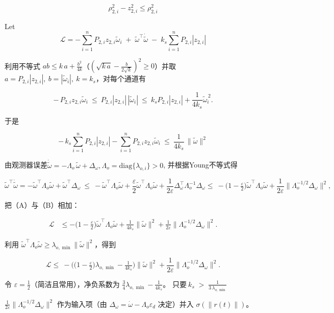 \documentclass[pdflatex,sn-mathphys-num]{sn-jnl}%
\theoremstyle{thmstyleone}%
\theoremstyle{thmstyletwo}%
\theoremstyle{thmstylethree}%
\begin{document}
$$
\rho_{2,i}^2 - z_{2,i}^2 \le \rho_{2,i}^2
$$



Let 
$$
\mathcal{L} =-\sum_{i=1}^nP_{2,i}z_{2,i}\tilde{\omega}_i\;+\;\tilde \omega^\top \dot{\tilde \omega}\;-\;k_s\sum_{i=1}^n P_{2,i} | z_{2,i} |
$$


利用不等式 $ab\le k\,a+\frac{b^2}{4k}$（$(\sqrt{k\,a}-\frac{b}{2\sqrt{k}})^2\ge0$）并取
$a=P_{2,i}|z_{2,i}|,\ b=|\tilde\omega_i|,\ k=k_s$，对每个通道有

$$
-\,P_{2,i}z_{2,i}\tilde\omega_i
\ \le\
P_{2,i}|z_{2,i}|\,|\tilde\omega_i|
\ \le\
k_s P_{2,i}|z_{2,i}|+\frac{1}{4k_s}\tilde\omega_i^{\,2}.
$$

于是

$$
-\,k_s\!\sum_{i=1}^n\! P_{2,i}|z_{2,i}|
-\sum_{i=1}^n P_{2,i}z_{2,i}\tilde\omega_i
\ \le\
\frac{1}{4k_s}\,\|\tilde\omega\|^2
$$


由观测器误差$
\dot{\tilde\omega}= -\Lambda_o\,\tilde\omega+\Delta_\omega,
\Lambda_o=\mathrm{diag}\{\lambda_{o,i}\}>0$, 并根据Young不等式得

$$
\tilde\omega^\top\dot{\tilde\omega}
= -\tilde\omega^\top\Lambda_o\tilde\omega+\tilde\omega^\top\Delta_\omega
\ \le\
-\tilde\omega^\top\Lambda_o\tilde\omega
+\frac{\varepsilon}{2}\tilde\omega^\top\Lambda_o\tilde\omega
+\frac{1}{2\varepsilon}\Delta_\omega^\top\Lambda_o^{-1}\Delta_\omega \le\
-\Big(1-\tfrac{\varepsilon}{2}\Big)\tilde\omega^\top\Lambda_o\tilde\omega
+\frac{1}{2\varepsilon}\big\|\Lambda_o^{-1/2}\Delta_\omega\big\|^2,
$$



把（A）与（B）相加：

$$
\begin{aligned}
	\mathcal{L}
&\le
-\Big(1-\tfrac{\varepsilon}{2}\Big)\tilde\omega^\top\Lambda_o\tilde\omega
+\frac{1}{4k_s}\|\tilde\omega\|^2
+\frac{1}{2\varepsilon}\big\|\Lambda_o^{-1/2}\Delta_\omega\big\|^2.
\end{aligned}
$$

利用 $\tilde\omega^\top\Lambda_o\tilde\omega\ge \lambda_{o,\min}\|\tilde\omega\|^2$，得到

$$
\mathcal{L} \le\
-\Big(\big(1-\tfrac{\varepsilon}{2}\big)\lambda_{o,\min}-\tfrac{1}{4k_s}\Big)\|\tilde\omega\|^2
+\frac{1}{2\varepsilon}\big\|\Lambda_o^{-1/2}\Delta_\omega\big\|^2.
$$

令 $\varepsilon=\tfrac12$（简洁且常用），净负系数为 $\tfrac{3}{4}\lambda_{o,\min}-\tfrac{1}{4k_s}$。
只要$
\boxed{ \ k_s\;>\;\frac{1}{3\,\lambda_{o,\min}}\ }$

 $\frac{1}{2\varepsilon}\|\Lambda_o^{-1/2}\Delta_\omega\|^2$ 作为输入项（由 $\Delta_\omega=\dot\omega-\Lambda_o\varepsilon_d$ 决定）并入 $\sigma(\|r(t)\|)$。
\end{document}
